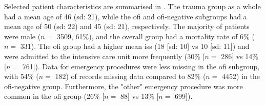 \documentclass[12pt, a4paper]{article}
\begin{document}
Selected patient characteristics are summarised in . The trauma group as a whole had a mean age of
46 (\acrshort{sd}: 21), while the \acrshort{ofi} and \acrshort{ofi}-negative subgroups had a mean age of 50
(\acrshort{sd}: 22) and 45 (\acrshort{sd}: 21), respectively. The majority of patients were male ($n = $ \num{3509},
61\%), and the overall group had a mortality rate of 6\% ($n = $ \num{331}). The \acrshort{ofi} group had a higher mean
\acrshort{iss} (18 [\acrshort{sd}: 10] vs 10 [\acrshort{sd}: 11]) and were admitted to the intensive care unit more
frequently (30\% [$n = $ \num{286}] vs 14\% [$n = $ \num{761}]). Data for emergency procedures were less missing in the
\acrshort{ofi} subgroup, with 54\% ($n = $ 182) of records missing data compared to 82\% ($n = $ \num{4452}) in the
\acrshort{ofi}-negative group. Furthermore, the "other" emergency procedure was more common in the \acrshort{ofi} group
(26\% [$n = $ \num{88}] vs 13\% [$n = $ \num{699}]).
\end{document}
